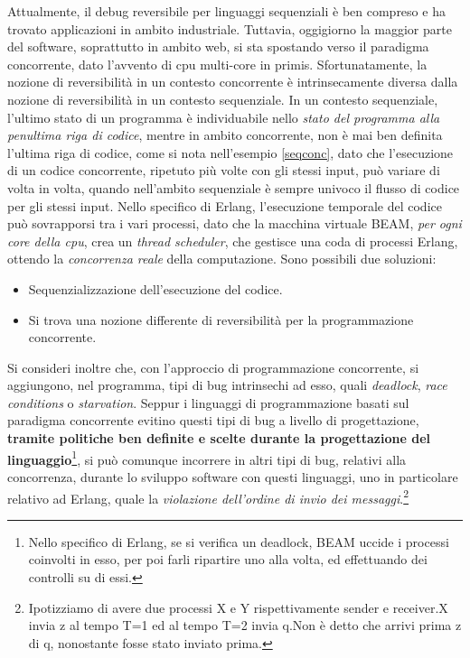\documentclass[Tesi.tex]{subfiles}
\begin{document}
Attualmente, il debug reversibile per linguaggi sequenziali è ben compreso e ha trovato applicazioni in ambito industriale.
Tuttavia, oggigiorno la maggior parte del software, soprattutto in ambito web, si sta spostando verso il paradigma concorrente, dato l'avvento di cpu multi-core in primis. Sfortunatamente, la nozione di reversibilità in un contesto concorrente è intrinsecamente diversa dalla nozione di reversibilità in un contesto sequenziale.
In un contesto sequenziale, l'ultimo stato di un programma è individuabile nello \textit{stato del programma alla penultima riga di codice}, mentre in ambito concorrente, non è mai ben definita l'ultima riga di codice, come si nota nell'esempio \ref{seqconc}, dato che l'esecuzione di un codice concorrente, ripetuto più volte con gli stessi input, può variare di volta in volta, quando nell'ambito sequenziale è sempre univoco il flusso di codice per gli stessi input.
Nello specifico di Erlang, l'esecuzione temporale del codice può sovrapporsi tra i vari processi, dato che  la macchina virtuale BEAM\cite{smp}, \textit{per ogni core della cpu}, crea un \textit{thread scheduler}, che gestisce una coda di processi Erlang, ottendo la \textit{concorrenza reale} della computazione.
Sono possibili due soluzioni:
\begin{itemize}
	\item Sequenzializzazione dell'esecuzione del codice.
	\item Si trova una nozione differente di reversibilità per la programmazione concorrente. 
\end{itemize}

Si consideri inoltre che, con l'approccio di programmazione concorrente, si aggiungono, nel programma, tipi di bug intrinsechi ad esso, quali \textit{deadlock}, \textit{race conditions} o \textit{starvation}.
Seppur i linguaggi di programmazione basati sul paradigma concorrente evitino questi tipi di bug a livello di progettazione, \textbf{tramite politiche ben definite e scelte durante la progettazione del linguaggio}\footnote{Nello specifico di Erlang, se si verifica un deadlock, BEAM uccide i processi coinvolti in esso, per poi farli ripartire uno alla volta, ed effettuando dei controlli su di essi.}, si può comunque incorrere in altri tipi di bug, relativi alla concorrenza, durante lo sviluppo software con questi linguaggi, uno in particolare relativo ad Erlang, quale la \textit{violazione dell'ordine di invio dei messaggi}.\footnote{Ipotizziamo di avere due processi X e Y rispettivamente sender e receiver.X invia z al tempo T=1 ed al tempo T=2 invia q.Non è detto che arrivi prima z di q, nonostante fosse stato inviato prima.}
\end{document}
